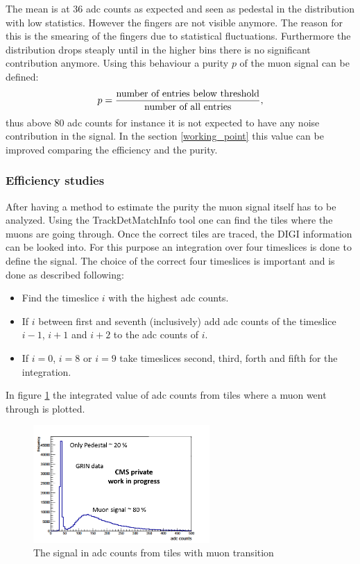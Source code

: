 			The mean is at 36 adc counts as expected and seen as pedestal in the distribution with low statistics.
			However the fingers are not visible anymore.
			The reason for this is the smearing of the fingers due to statistical fluctuations.
			Furthermore the distribution drops steaply until in the higher bins there is no significant contribution anymore.
			Using this behaviour a purity $p$ of the muon signal can be defined:
			\begin{equation}
				p = \frac{\textnormal{number of entries below threshold}}{\textnormal{number of all entries}},
			\end{equation}
			thus above 80 adc counts for instance it is not expected to have any noise contribution in the signal.
			In the section \ref{working_point} this value can be improved comparing the efficiency and the purity.
		\subsubsection{Efficiency studies}
			After having a method to estimate the purity the muon signal itself has to be analyzed.
			Using the TrackDetMatchInfo tool one can find the tiles where the muons are going through.
			Once the correct tiles are traced, the DIGI information can be looked into.
			For this purpose an integration over four timeslices is done to define the signal.
			The choice of the correct four timeslices is important and is done as described following:
			\begin{itemize}
			  \item Find the timeslice $i$ with the highest adc counts.
			  \item If $i$ between first and seventh (inclusively) add adc counts of the timeslice $i-1$, $i+1$ and $i+2$ to the adc counts of $i$.
			  \item If $i=0$, $i=8$ or $i=9$ take timeslices second, third, forth and fifth for the integration.
			\end{itemize}
			In figure \ref{fig:efficiency1x1} the integrated value of adc counts from tiles where a muon went through is plotted.
			\begin{figure}[htbp]
				\centering
				\includegraphics[width=0.60\textwidth]{Figures/erdogan/efficiency1x1.png}
				\caption{The signal in adc counts from tiles with muon transition}
				\label{fig:efficiency1x1}
			\end{figure}
